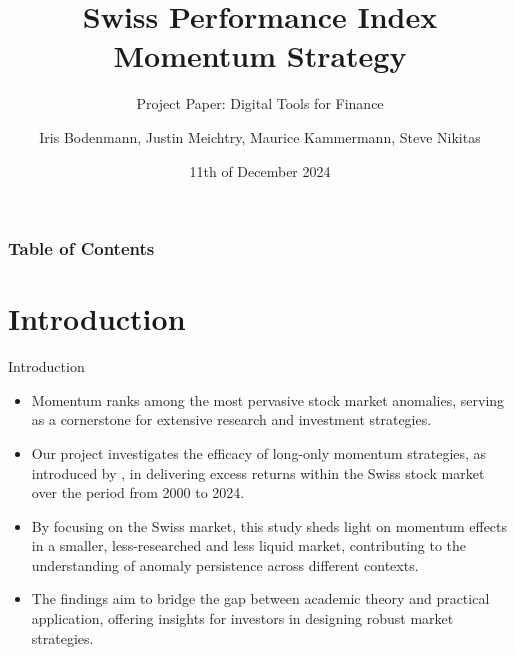 \documentclass[10pt]{beamer}
\title{Swiss Performance Index Momentum Strategy}
\subtitle{Project Paper: Digital Tools for Finance}
\author{Iris Bodenmann, Justin Meichtry, Maurice Kammermann, Steve Nikitas}
\date{11th of December 2024}
\institute[]{Igor Pozdeev\\Department of Finance\\ University of Zurich}
\begin{document}
\begin{frame}
\maketitle
\end{frame}

\begin{frame}
\frametitle{Table of Contents}
\tableofcontents
\end{frame}

\section{Introduction}
\begin{frame}{Introduction}
\begin{itemize}
    \item Momentum ranks among the most pervasive stock market anomalies, serving as a cornerstone for extensive research and investment strategies.
    \item Our project investigates the efficacy of long-only momentum strategies, as introduced by \cite{jegatit1993}, in delivering excess returns within the Swiss stock market over the period from 2000 to 2024.
    \item By focusing on the Swiss market, this study sheds light on momentum effects in a smaller, less-researched and less liquid market, contributing to the understanding of anomaly persistence across different contexts.
    \item The findings aim to bridge the gap between academic theory and practical application, offering insights for investors in designing robust market strategies.
\end{itemize}
\end{frame}

\end{document}
